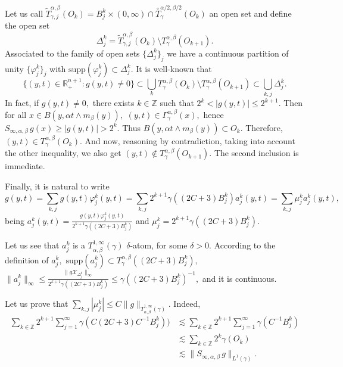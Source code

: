 \documentclass[leqno,11pt]{amsart}
\theoremstyle{plain}
\theoremstyle{remark}
\begin{document}
{{{   Let us call $\widetilde{T}_{\gamma, j}^{\alpha, \beta}(O_k)=B_j^k\times (0,\infty)\cap \overset{\circ}{T}^{\alpha/2, \beta/2}_\gamma (O_k)$ an open set and define the open set $$\Delta_j^k=\widetilde{T}_{\gamma, j}^{\alpha, \beta}(O_k)\setminus T_\gamma^{\alpha, \beta}(O_{k+1}).$$ 
   Associated to the family of open sets $\{\Delta_j^k\}_j$ we have a continuous partition of unity $\{\varphi_j^k\}_j$ with $\text{supp}(\varphi_j^k)\subset \Delta_j^k.$ It is well-known that
   \begin{equation*}
\{(y,t)\in \mathbb{R}^{n+1}_+: g(y,t)\ne 0\}\subset \bigcup_{k}T^{\alpha,\beta}_\gamma (O_k)\setminus T^{\alpha, \beta}_\gamma(O_{k+1})\subset \bigcup_{k,j}\Delta_j^k.
   \end{equation*}
   In fact, if $g(y,t)\ne 0,$ there exists $k\in {\mathbb Z}$ such that $2^k<|g(y,t)|\le 2^{k+1}.$ Then for all $x\in B(y, \alpha t\wedge m_\beta(y)),$ $(y,t)\in \Gamma_\gamma^{\alpha, \beta}(x),$ hence $S_{\infty, \alpha,\beta}\, g(x)\ge |g(y,t)|>2^{k}.$ Thus $B(y,\alpha t \wedge m_\beta(y))\subset O_k.$ Therefore,  $(y,t)\in T^{\alpha, \beta}_\gamma (O_k)$. And now, reasoning by contradiction, taking into account the other inequality, we also get $(y,t)\notin T^{\alpha,\beta}_\gamma(O_{k+1}).$ The second inclusion is immediate.
   
   Finally, it is natural to write \begin{equation*}
g(y,t)=\sum_{k, j}g (y,t)\varphi_j^k(y,t)=\sum_{k,j} 2^{k+1}\gamma((2C+3)B_j^k)a_j^k(y,t)= \sum_{k,j}\mu_j^k a_j^k(y,t),
   \end{equation*}
   being $a_j^k (y,t)=\frac{g (y,t) \varphi_j^k (y,t)} {2^{k+1}\gamma((2C+3)B_j^k)}$ {{and $\mu_j^k=2^{k+1}\gamma((2C+3)B_j^k). $}}}

   Let us see that $a_j^k$ is a $T_{\alpha, \beta}^{1,\infty}(\gamma)$ $\delta$-atom, for some $\delta>0.$
According to the definition of $a_j^k,$ $\text{supp}(a_j^k)\subset T^{\alpha, \beta}_\gamma( (2C+3)B_j^k),$ $\|a_j^k\|_\infty\le \frac{\|g \mathcal{X}_{\Delta_j^k}\|_\infty}{2^{k+1} \gamma((2C+3)B_j^k)}\le \gamma((2C+3)B_j^k)^{-1},$ and it is continuous. 

Let us prove that $\displaystyle \sum_{k,j}|\mu_j^k|\le C \|g\|_{T^{1,\infty}_{\alpha, \beta}(\gamma)}.$ Indeed, \begin{align*}
\sum_{k\in{\mathbb Z}} 2^{k+1}\sum_{j=1}^\infty \gamma(C(2C+3)C^{-1}B_j^k))&\lesssim \sum_{k\in {\mathbb Z}}2^{k+1} \sum_{j=1}^\infty
\gamma(C^{-1}B_j^k)\\&\lesssim \sum_{k\in {\mathbb Z}}2^k \gamma(O_k)\\ &\lesssim \|S_{\infty,\alpha, \beta}\, g\|_{L^1(\gamma)}.\end{align*}

}}
\end{document}

